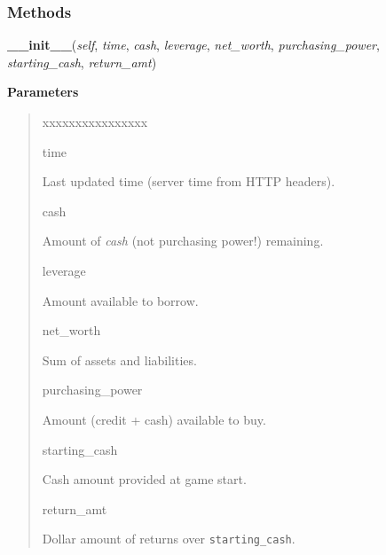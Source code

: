   \subsubsection{Methods}

    \label{moira:Portfolio:__init__}

    \vspace{0.5ex}

\hspace{.8\funcindent}\begin{boxedminipage}{\funcwidth}

    \raggedright \textbf{\_\_init\_\_}(\textit{self}, \textit{time}, \textit{cash}, \textit{leverage}, \textit{net\_worth}, \textit{purchasing\_power}, \textit{starting\_cash}, \textit{return\_amt})

\setlength{\parskip}{2ex}
\setlength{\parskip}{1ex}
      \textbf{Parameters}
      \vspace{-1ex}

      \begin{quote}
        \begin{Ventry}{xxxxxxxxxxxxxxxx}

          \item[time]

          Last updated time (server time from HTTP headers).

          \item[cash]

          Amount of \textit{cash} (not purchasing power!) remaining.

          \item[leverage]

          Amount available to borrow.

          \item[net\_worth]

          Sum of assets and liabilities.

          \item[purchasing\_power]

          Amount (credit + cash) available to buy.

          \item[starting\_cash]

          Cash amount provided at game start.

          \item[return\_amt]

          Dollar amount of returns over \texttt{starting\_cash}.

        \end{Ventry}

      \end{quote}

    \end{boxedminipage}

